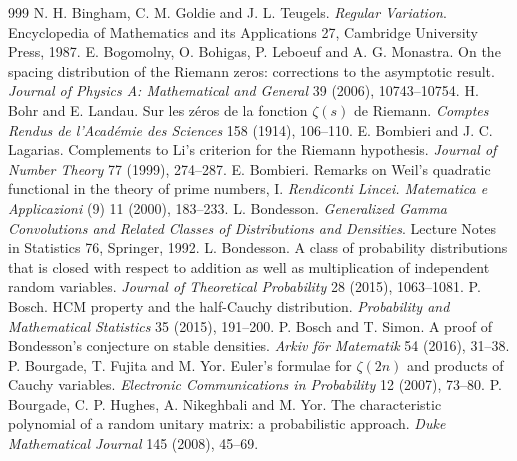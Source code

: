 \begin{thebibliography}{999}
 N. H. Bingham, C. M. Goldie and J. L. Teugels. \emph{Regular Variation}. Encyclopedia of Mathematics and its Applications 27, Cambridge University Press, 1987.
 E. Bogomolny, O. Bohigas, P. Leboeuf and A. G. Monastra. On the spacing distribution of the Riemann zeros: corrections to the asymptotic result. \emph{Journal of Physics A: Mathematical and General} 39 (2006), 10743--10754.
 H. Bohr and E. Landau. Sur les z\'eros de la fonction $\zeta(s)$ de Riemann. \emph{Comptes Rendus de l'Acad\'emie des Sciences} 158 (1914), 106--110.
 E. Bombieri and J. C. Lagarias. Complements to Li's criterion for the Riemann hypothesis. \emph{Journal of Number Theory} 77 (1999), 274--287.
 E. Bombieri. Remarks on Weil's quadratic functional in the theory of prime numbers, I. \emph{Rendiconti Lincei. Matematica e Applicazioni} (9) 11 (2000), 183--233.
 L. Bondesson. \emph{Generalized Gamma Convolutions and Related Classes of Distributions and Densities}. Lecture Notes in Statistics 76, Springer, 1992.
 L. Bondesson. A class of probability distributions that is closed with respect to addition as well as multiplication of independent random variables. \emph{Journal of Theoretical Probability} 28 (2015), 1063--1081.
 P. Bosch. HCM property and the half-Cauchy distribution. \emph{Probability and Mathematical Statistics} 35 (2015), 191--200.
 P. Bosch and T. Simon. A proof of Bondesson's conjecture on stable densities. \emph{Arkiv f\"or Matematik} 54 (2016), 31--38.
 P. Bourgade, T. Fujita and M. Yor. Euler's formulae for $\zeta(2n)$ and products of Cauchy variables. \emph{Electronic Communications in Probability} 12 (2007), 73--80.
 P. Bourgade, C. P. Hughes, A. Nikeghbali and M. Yor. The characteristic polynomial of a random unitary matrix: a probabilistic approach. \emph{Duke Mathematical Journal} 145 (2008), 45--69.

\end{thebibliography}
